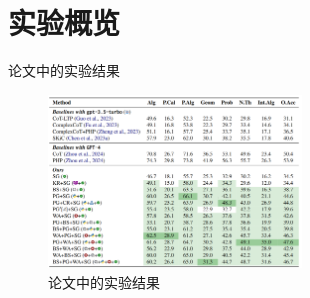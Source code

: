 \section{实验概览}




\begin{frame}{论文中的实验结果}
	\begin{center}
		\begin{figure}
			\includegraphics[width=0.6\textwidth]{./pic/1.png}
			\caption{论文中的实验结果}
		\end{figure}
	\end{center}
\end{frame}

